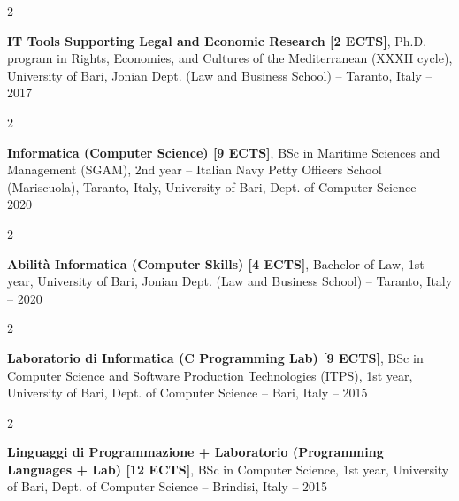 \documentclass[10pt, a4paper]{article}
\newenvironment{twocolentry}[2][]{
    \onecolentry
    \def\secondColumn{#2}
    \setcolumnwidth{\fill, 4.5 cm}
    \begin{paracol}{2}
}{
    \switchcolumn \raggedleft \secondColumn
    \end{paracol}
    \endonecolentry
} %
\begin{document}
        \vspace{0.2 cm}

        \begin{twocolentry}{
            2016 – 2017
        }
            \textbf{IT Tools Supporting Legal and Economic Research [2 ECTS]}, Ph.D. program in Rights, Economies, and Cultures of the Mediterranean (XXXII cycle), University of Bari, Jonian Dept. (Law and Business School) -- Taranto, Italy\end{twocolentry}



        \vspace{0.2 cm}

        \begin{twocolentry}{
            2015 – 2020
        }
            \textbf{Informatica (Computer Science) [9 ECTS]}, BSc in Maritime Sciences and Management (SGAM), 2nd year -- Italian Navy Petty Officers School (Mariscuola), Taranto, Italy, University of Bari, Dept. of Computer Science\end{twocolentry}



        \vspace{0.2 cm}

        \begin{twocolentry}{
            2015 – 2020
        }
            \textbf{Abilità Informatica (Computer Skills) [4 ECTS]}, Bachelor of Law, 1st year, University of Bari, Jonian Dept. (Law and Business School) -- Taranto, Italy\end{twocolentry}



        \vspace{0.2 cm}

        \begin{twocolentry}{
            2014 – 2015
        }
            \textbf{Laboratorio di Informatica (C Programming Lab) [9 ECTS]}, BSc in Computer Science and Software Production Technologies (ITPS), 1st year, University of Bari, Dept. of Computer Science -- Bari, Italy\end{twocolentry}



        \vspace{0.2 cm}

        \begin{twocolentry}{
            2014 – 2015
        }
            \textbf{Linguaggi di Programmazione + Laboratorio (Programming Languages + Lab) [12 ECTS]}, BSc in Computer Science, 1st year, University of Bari, Dept. of Computer Science -- Brindisi, Italy\end{twocolentry}
\end{document}
